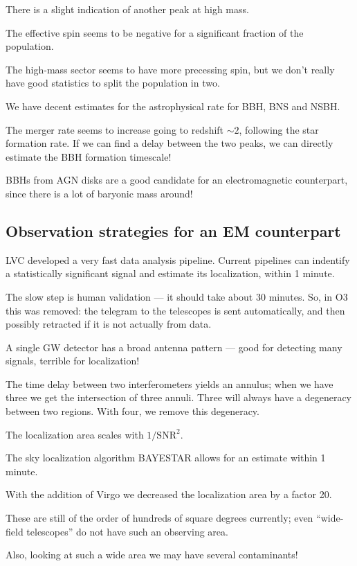 \documentclass[main.tex]{subfiles}
\begin{document}
There is a slight indication of another peak at high mass. 

The effective spin seems to be negative for a significant fraction of the population. 

The high-mass sector seems to have more precessing spin, but we don't really have good statistics to split the population in two.

We have decent estimates for the astrophysical rate for BBH, BNS and NSBH. 

The merger rate seems to increase going to redshift \(\sim 2\), following the star formation rate. 
If we can find a delay between the two peaks, we can directly estimate the BBH formation timescale! 

BBHs from AGN disks are a good candidate for an electromagnetic counterpart, since there is a lot of baryonic mass around!

\subsection{Observation strategies for an EM counterpart}

LVC developed a very fast data analysis pipeline.
Current pipelines can indentify a statistically significant signal
and estimate its localization, within 1 minute. 

The slow step is human validation --- it should take about 30 minutes. 
So, in O3 this was removed: the telegram to the telescopes is sent automatically, and then possibly retracted if it is not actually from data.

A single GW detector has a broad antenna pattern --- good for detecting many signals, terrible for localization! 

The time delay between two interferometers yields an annulus; when we have three we get the intersection of three annuli. 
Three will always have a degeneracy between two regions. 
With four, we remove this degeneracy. 

The localization area scales with \(1 / \text{SNR}^2\). 

The sky localization algorithm BAYESTAR allows for an estimate within 1 minute. 

With the addition of Virgo we decreased the localization area by a factor 20. 

These are still of the order of hundreds of square degrees currently; 
even ``wide-field telescopes'' do not have such an observing area. 

Also, looking at such a wide area we may have several contaminants! 
\end{document}
